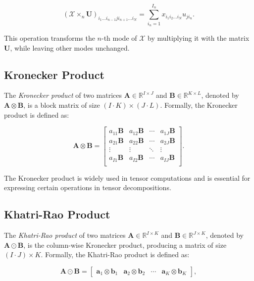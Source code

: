 \documentclass[a4paper,14pt]{article}
\theoremstyle{plain} %
\theoremstyle{definition} %
\theoremstyle{remark} %
\theoremstyle{definition}
\theoremstyle{remark}
\theoremstyle{remark}
\begin{document}
	
	\[
	(\mathcal{X} \times_n \mathbf{U})_{i_1 \dots i_{n-1} j i_{n+1} \dots i_N} = \sum_{i_n=1}^{I_n} x_{i_1 i_2 \dots i_N} u_{j i_n}.
	\]
	
	This operation transforms the \( n \)-th mode of \(\mathcal{X}\) by multiplying it with the matrix \(\mathbf{U}\), while leaving other modes unchanged.
	
	\subsection{Kronecker Product}
	
	The \textit{Kronecker product} of two matrices \(\mathbf{A} \in \mathbb{R}^{I \times J}\) and \(\mathbf{B} \in \mathbb{R}^{K \times L}\), denoted by \(\mathbf{A} \otimes \mathbf{B}\), is a block matrix of size \((I \cdot K) \times (J \cdot L)\). Formally, the Kronecker product is defined as:
	
	\[
	\mathbf{A} \otimes \mathbf{B} = 
	\begin{bmatrix}
		a_{11} \mathbf{B} & a_{12} \mathbf{B} & \cdots & a_{1J} \mathbf{B} \\
		a_{21} \mathbf{B} & a_{22} \mathbf{B} & \cdots & a_{2J} \mathbf{B} \\
		\vdots & \vdots & \ddots & \vdots \\
		a_{I1} \mathbf{B} & a_{I2} \mathbf{B} & \cdots & a_{IJ} \mathbf{B} \\
	\end{bmatrix}.
	\]
	
	The Kronecker product is widely used in tensor computations and is essential for expressing certain operations in tensor decompositions.
	
	\subsection{Khatri-Rao Product}
	
	The \textit{Khatri-Rao product} of two matrices \(\mathbf{A} \in \mathbb{R}^{I \times K}\) and \(\mathbf{B} \in \mathbb{R}^{J \times K}\), denoted by \(\mathbf{A} \odot \mathbf{B}\), is the column-wise Kronecker product, producing a matrix of size \((I \cdot J) \times K\). Formally, the Khatri-Rao product is defined as:
	
	\[
	\mathbf{A} \odot \mathbf{B} = 
	\begin{bmatrix}
		\mathbf{a}_1 \otimes \mathbf{b}_1 & \mathbf{a}_2 \otimes \mathbf{b}_2 & \cdots & \mathbf{a}_K \otimes \mathbf{b}_K
	\end{bmatrix},
	\]
	
\end{document}
